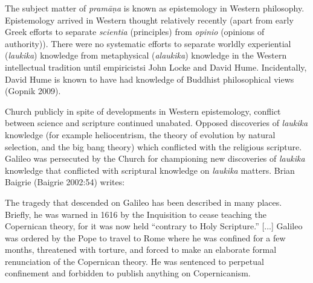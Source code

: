 The subject matter of {\sl pramāṇa} is known as epistemology in Western philosophy.  Epistemology arrived in Western thought relatively recently (apart from early Greek efforts to separate {\sl scientia} (principles) from {\sl opinio} (opinions of authority)). There were no systematic efforts to separate worldly experiential ({\sl laukika}) knowledge from metaphysical ({\sl alaukika}) knowledge in the Western intellectual tradition until empiricistsi John Locke and David Hume.  Incidentally, David Hume is known to have had knowledge of Buddhist philosophical views (Gopnik 2009).

Church publicly in spite of developments in Western epistemology, conflict between science and scripture continued unabated. Opposed discoveries of {\sl laukika} knowledge (for example heliocentrism, the theory of evolution by natural selection, and the big bang theory) which conflicted with the religious scripture.  Galileo was persecuted by the Church for championing new discoveries of {\sl laukika} knowledge that conflicted with scriptural knowledge on {\sl laukika} matters.  Brian Baigrie (Baigrie 2002:54) writes:

\begin{myquote}
The tragedy that descended on Galileo has been described in many places. Briefly, he was warned in 1616 by the Inquisition to cease teaching the Copernican theory, for it was now held ``contrary to Holy Scripture.'' [...] Galileo was ordered by the Pope to travel to Rome where he was confined for a few months, threatened with torture, and forced to make an elaborate formal renunciation of the Copernican theory.  He was sentenced to perpetual confinement and forbidden to publish anything on Copernicanism.
\end{myquote}

